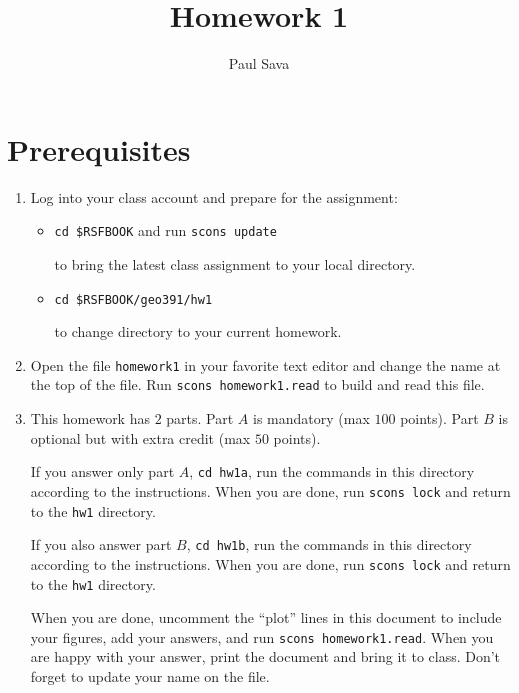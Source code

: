 \author{Paul Sava}
\title{Homework 1}




\section{Prerequisites}

\begin{enumerate}
\item Log into your class account and prepare for the assignment:

\begin{itemize}
\item \texttt{cd \$RSFBOOK} and run \texttt{scons update} \par
to bring the latest class assignment to your local directory.
\item \texttt{cd \$RSFBOOK/geo391/hw1} \par
to change directory to your current homework.
\end{itemize}

\item Open the file \texttt{homework1} in your favorite text editor
and change the name at the top of the file.
Run \texttt{scons homework1.read} to build and read this file.

\item This homework has $2$ parts. 
Part $A$ is mandatory (max $100$ points).
Part $B$ is optional but with extra credit (max $50$ points).

If you answer only part $A$, \texttt{cd hw1a},
run the commands in this directory according to the 
instructions. When you are done, run \texttt{scons lock} and
return to the \texttt{hw1} directory.

If you also answer part $B$, \texttt{cd hw1b},
run the commands in this directory according to the 
instructions. When you are done, run \texttt{scons lock} and
return to the \texttt{hw1} directory.

When you are done, uncomment the ``plot'' lines in this document
to include your figures, add your answers, and run
\texttt{scons homework1.read}. 
When you are happy with your answer, print the document and
bring it to class. Don't forget to update your name on the file.

\end{enumerate}


